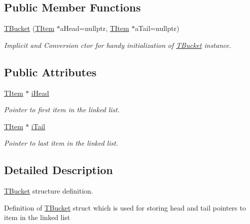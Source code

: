 \subsection*{Public Member Functions}
\begin{DoxyCompactItemize}
\item 
\hyperlink{struct_c_hash_map_1_1_t_bucket_a8215764debe089e414b6f79d351cb4e2}{T\+Bucket} (\hyperlink{struct_c_hash_map_1_1_t_item}{T\+Item} $\ast$a\+Head=nullptr, \hyperlink{struct_c_hash_map_1_1_t_item}{T\+Item} $\ast$a\+Tail=nullptr)
\begin{DoxyCompactList}\small\item\em Implicit and Conversion c\textquotesingle{}tor for handy initialization of \hyperlink{struct_c_hash_map_1_1_t_bucket}{T\+Bucket} instance. \end{DoxyCompactList}\end{DoxyCompactItemize}
\subsection*{Public Attributes}
\begin{DoxyCompactItemize}
\item 
\hyperlink{struct_c_hash_map_1_1_t_item}{T\+Item} $\ast$ \hyperlink{struct_c_hash_map_1_1_t_bucket_a03a10c5ce912fd09137778c3454e7d77}{i\+Head}
\begin{DoxyCompactList}\small\item\em Pointer to first item in the linked list. \end{DoxyCompactList}\item 
\hyperlink{struct_c_hash_map_1_1_t_item}{T\+Item} $\ast$ \hyperlink{struct_c_hash_map_1_1_t_bucket_a1b8b634924907ed251a58eee989d577a}{i\+Tail}
\begin{DoxyCompactList}\small\item\em Pointer to last item in the linked list. \end{DoxyCompactList}\end{DoxyCompactItemize}


\subsection{Detailed Description}
\hyperlink{struct_c_hash_map_1_1_t_bucket}{T\+Bucket} structure definition. 

Definition of \hyperlink{struct_c_hash_map_1_1_t_bucket}{T\+Bucket} struct which is used for storing head and tail pointers to item in the linked list 


